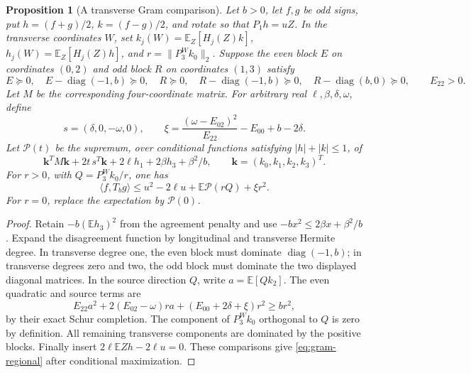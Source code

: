 \documentclass[11pt]{article}
\newcommand{\E}{\mathbb E}
\newtheorem{proposition}[theorem]{Proposition}
\begin{document}
\begin{proposition}[A transverse Gram comparison]\label{prop:gram}
Let $b>0$, let $f,g$ be odd signs, put $h=(f+g)/2$, $k=(f-g)/2$,
and rotate so that $P_1h=uZ$. In the transverse coordinates $W$, set
$k_j(W)=\E_Z[H_j(Z)k]$, $h_j(W)=\E_Z[H_j(Z)h]$, and
$r=\|P_3^Wk_0\|_2$. Suppose the even block $E$ on coordinates $(0,2)$
and odd block $R$ on coordinates $(1,3)$ satisfy
\[
 E\succeq0,\quad E-\operatorname{diag}(-1,b)\succeq0,
 \quad R\succeq0,\quad R-\operatorname{diag}(-1,b)\succeq0,
 \quad R-\operatorname{diag}(b,0)\succeq0,
 \qquad E_{22}>0.
\]
Let $M$ be the corresponding four-coordinate matrix. For arbitrary
real $\ell,\beta,\delta,\omega$, define
\[
 s=(\delta,0,-\omega,0),\qquad
 \xi=\frac{(\omega-E_{02})^2}{E_{22}}-E_{00}+b-2\delta.
\]
Let $\mathcal P(t)$ be the supremum, over conditional functions satisfying
$|h|+|k|\le1$, of
\[
 \mathbf k^TM\mathbf k+2t\,s^T\mathbf k
       +2\ell h_1+2\beta h_3+\beta^2/b,
 \qquad \mathbf k=(k_0,k_1,k_2,k_3)^T.
\]
For $r>0$, with $Q=P_3^Wk_0/r$, one has
\begin{equation}\label{eq:gram-regional}
 \langle f,T_bg\rangle\le
 u^2-2\ell u+\E\mathcal P(rQ)+\xi r^2.
\end{equation}
For $r=0$, replace the expectation by $\mathcal P(0)$.
\end{proposition}
\begin{proof}
Retain $-b(\E h_3)^2$ from the agreement penalty and use
$-bx^2\le2\beta x+\beta^2/b$. Expand the disagreement function by
longitudinal and transverse Hermite degree. In transverse degree one,
the even block must dominate $\operatorname{diag}(-1,b)$; in transverse
degrees zero and two, the odd block must dominate the two displayed
diagonal matrices. In the source direction $Q$, write
$a=\E[Qk_2]$. The even quadratic and source terms are
\[
 E_{22}a^2+2(E_{02}-\omega)ra+(E_{00}+2\delta+\xi)r^2
 \ge br^2,
\]
by their exact Schur completion. The component of $P_3^Wk_0$
orthogonal to $Q$ is zero by definition. All remaining transverse
components are dominated by the positive blocks. Finally insert
$2\ell\E Zh-2\ell u=0$. These comparisons give
\eqref{eq:gram-regional} after conditional maximization.
\end{proof}
\end{document}
